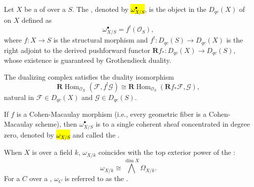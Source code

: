 \begin{definition} \label{definition:dualizing_complex_of_proper_finite_type_scheme_over_locally_noetherian_scheme}
    Let $X$ be a   of  over a  $S$. 
    The , denoted by \hl{$\omega_{X/S}^\bullet$}, is the object in the  $D_{qc}(X)$ of  on $X$ defined as
    $$\omega_{X/S}^\bullet = f^!(\mathcal{O}_S),$$
    where $f\colon X \to S$ is the structural morphism and $f^!\colon D_{qc}(S) \to D_{qc}(X)$ is the right adjoint to the derived pushforward functor $\mathbf{R}f_*\colon D_{qc}(X) \to D_{qc}(S)$, whose existence is guaranteed by Grothendieck duality. 

    The dualizing complex satisfies the duality isomorphism
    $$\mathbf{R}\operatorname{Hom}_{\mathcal{O}_X}(\mathcal{F}, f^!\mathcal{G}) \cong \mathbf{R}\operatorname{Hom}_{\mathcal{O}_S}(\mathbf{R}f_*\mathcal{F}, \mathcal{G}),$$
    natural in $\mathcal{F} \in D_{qc}(X)$ and $\mathcal{G} \in D_{qc}(S)$.

    If $f$ is a Cohen-Macaulay morphism (i.e., every geometric fiber is a Cohen-Macaulay scheme), then $\omega_{X/S}^\bullet$ is  to a single coherent sheaf concentrated in degree zero, denoted by \hl{$\omega_{X/S}$} and called the . 

    When $X$ is  over a field $k$, $\omega_{X/k}$ coincides with the top exterior power of the :
    $$\omega_{X/k} \cong \bigwedge^{\!\dim X}\Omega_{X/k}.$$
    For a  $C$ over a , $\omega_C$ is referred to as the .
\end{definition}
